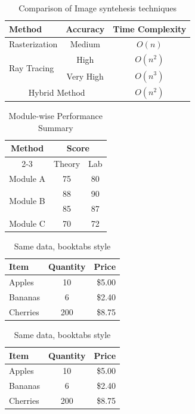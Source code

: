 \documentclass{article}
\begin{document}
\begin{table}[h]
\centering
  \begin{tabular}{|l|c|c|}
    \hline
    Method & Accuracy & Time Complexity \\
    \hline
    Rasterization & Medium & $O(n)$ \\
    \hline
    \multirow{2}{*}{Ray Tracing} & High & $O(n^2)$ \\
    & Very High& $O(n^3)$\\
    \hline
    \multicolumn{2}{|c|}{Hybrid Method} & $O(n^2)$ \\
    \hline
  \end{tabular}
  \caption{ Comparison of Image syntehesis techniques}
\end{table}

\begin{table}
\centering
\begin{tabular}{|c|c|c|}
  \hline
  \multirow{2}{*}{Method} & \multicolumn{2}{c|}{Score} \\
  \cline{2-3}
  & Theory & Lab \\
  \hline
  Module A & 75 & 80\\
  \multirow{2}{*}{Module B} & 88 & 90\\
  & 85 & 87\\
  \hline
  Module C & 70 & 72\\
  \hline
  
\end{tabular}
\caption{Module-wise Performance Summary}
\end{table}


\begin{table}[h]
  \centering
  \begin{tabular}{lcr}
    \toprule
    Item & Quantity & Price \\
    \midrule
    Apples & 10 & \$5.00 \\
    Bananas & 6 & \$2.40 \\
    Cherries & 200 & \$8.75 \\
    \bottomrule
  \end{tabular}
  \caption{Same data, booktabs style}
\end{table}

\begin{table}[h]
  \centering
  \begin{tabular}{lcr}
    \toprule
    Item & Quantity & Price \\
    \midrule
    Apples & 10 & \$5.00 \\
    Bananas & 6 & \$2.40 \\
    Cherries & 200 & \$8.75 \\
    \bottomrule
  \end{tabular}
  \caption{Same data, booktabs style}
\end{table}
\end{document}
